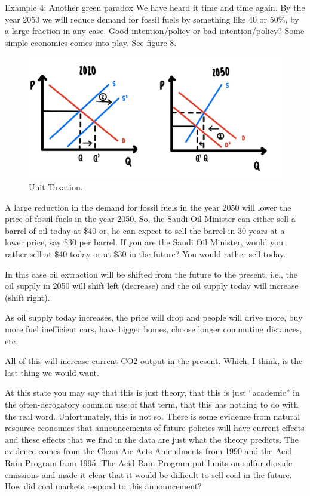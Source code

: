 \documentclass[
]{book}
\begin{document}
Example 4: Another green paradox
We have heard it time and time again. By the year 2050 we will reduce demand for fossil fuels by something like 40 or 50\%, by a large fraction in any case.
Good intention/policy or bad intention/policy?
Some simple economics comes into play. See figure 8.

\begin{figure}

{\centering \includegraphics[width=0.5\linewidth]{img/compmarkets/fig8} 

}

\caption{Unit Taxation.}\label{fig:compmarkets08}
\end{figure}

A large reduction in the demand for fossil fuels in the year 2050 will lower the price of fossil fuels in the year 2050. So, the Saudi Oil Minister can either sell a barrel of oil today at \$40 or, he can expect to sell the barrel in 30 years at a lower price, say \$30 per barrel. If you are the Saudi Oil Minister, would you rather sell at \$40 today or at \$30 in the future?
You would rather sell today.

In this case oil extraction will be shifted from the future to the present, i.e., the oil supply in 2050 will shift left (decrease) and the oil supply today will increase (shift right).

As oil supply today increases, the price will drop and people will drive more, buy more fuel inefficient cars, have bigger homes, choose longer commuting distances, etc.

All of this will increase current CO2 output in the present. Which, I think, is the last thing we would want.

At this state you may say that this is just theory, that this is just ``academic'' in the often-derogatory common use of that term, that this has nothing to do with the real word. Unfortunately, this is not so. There is some evidence from natural resource economics that announcements of future policies will have current effects and these effects that we find in the data are just what the theory predicts. The evidence comes from the Clean Air Acts Amendments from 1990 and the Acid Rain Program from 1995. The Acid Rain Program put limits on sulfur-dioxide emissions and made it clear that it would be difficult to sell coal in the future. How did coal markets respond to this announcement?
\end{document}
